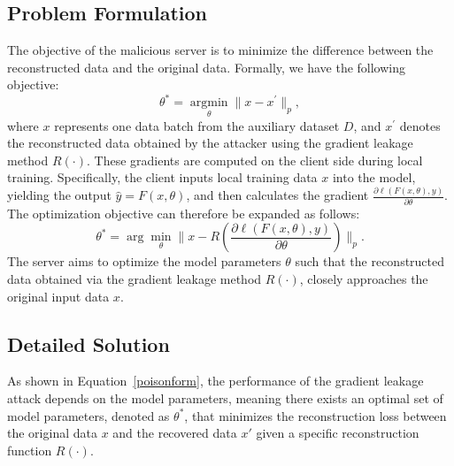 \subsection{Problem Formulation}
The objective of the malicious server is to minimize the difference between the reconstructed data and the original data. Formally, we have the following objective:
\begin{equation}
    \theta^*=\underset{\theta}{\operatorname*{argmin}}\|x-x^{\prime}\|_p,
\end{equation}
where $x$ represents one data batch from the auxiliary dataset $D$, and $x^{\prime}$ denotes the reconstructed data obtained by the attacker using the gradient leakage method $R(\cdot)$. These gradients are computed on the client side during local training. 
Specifically, the client inputs local training data $x$ into the model, yielding the output $\hat{y}=F(x,\theta)$, 
and then calculates the gradient $\frac{\partial \ell(F(x,\theta),y)}{\partial\theta}$. The optimization objective can therefore be expanded as follows:
\begin{equation}
\label{poisonform}
    \theta^*=\arg\min_\theta\|x-R\left(\frac{\partial \ell(F(x,\theta),y)}{\partial\theta}\right)\|_p.
\end{equation}
The server aims to optimize the model parameters $\theta$ such that the reconstructed data obtained via the gradient leakage method $R(\cdot)$, closely approaches the original input data $x$.

\subsection{Detailed Solution}
As shown in Equation~\eqref{poisonform}, the performance of the gradient leakage attack depends on the model parameters, meaning there exists an optimal set of model parameters, denoted as $\theta^\ast$, that minimizes the reconstruction loss between the original data $x$ and the recovered data $x'$ given a specific reconstruction function $R(\cdot)$. 

